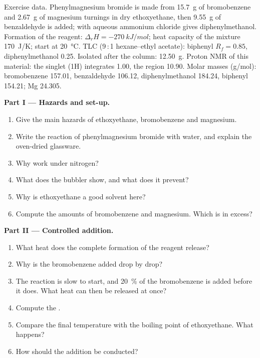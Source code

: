 \begin{problem}
\label{pb:b2:lab-techniques-2:1}
Exercise data. Phenylmagnesium bromide is made from \qty{15.7}{g} of bromobenzene and \qty{2.67}{g} of
magnesium turnings in dry ethoxyethane, then \qty{9.55}{g} of benzaldehyde is added;  with
aqueous ammonium chloride gives diphenylmethanol. Formation of the reagent: $\Delta_rH =
\qty{-270}{kJ/mol}$; heat capacity of the mixture \qty{170}{J/K}; start at \qty{20}{\degreeCelsius}. TLC
(9\,:\,1 hexane--ethyl acetate): biphenyl $R_f = 0.85$, diphenylmethanol 0.25. Isolated after the column:
\qty{12.50}{g}. Proton NMR of this material: the  singlet (1H) integrates 1.00, the 
region 10.90. Molar masses (\unit{g/mol}): bromobenzene 157.01, benzaldehyde 106.12, diphenylmethanol
184.24, biphenyl 154.21; Mg 24.305.

\medskip
\noindent\textbf{Part I --- Hazards and set-up.}
\begin{enumerate}
  \item Give the main hazards of ethoxyethane, bromobenzene and magnesium.
  \item Write the reaction of phenylmagnesium bromide with water, and explain the oven-dried glassware.
  \item Why work under nitrogen?
  \item What does the bubbler show, and what does it prevent?
  \item Why is ethoxyethane a good solvent here?
  \item Compute the amounts of bromobenzene and magnesium. Which is in excess?
\end{enumerate}

\medskip
\noindent\textbf{Part II --- Controlled addition.}
\begin{enumerate}[resume]
  \item What heat does the complete formation of the reagent release?
  \item Why is the bromobenzene added drop by drop?
  \item The reaction is slow to start, and 20~\% of the bromobenzene is added before it does. What heat
        can then be released at once?
  \item Compute the .
  \item Compare the final temperature with the boiling point of ethoxyethane. What happens?
  \item How should the addition be conducted?
\end{enumerate}


\end{problem}
